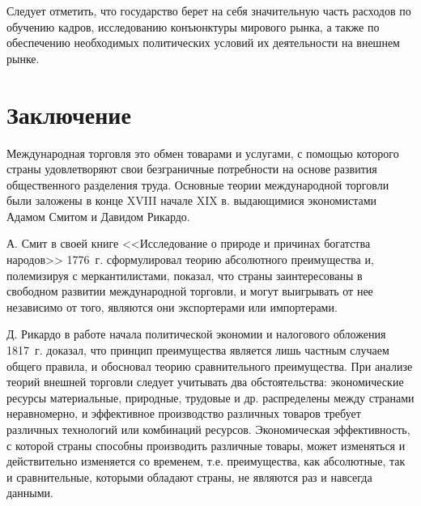 \begin{enumerate}
    Следует отметить, что государство берет на себя значительную часть расходов
    по обучению кадров, исследованию конъюнктуры мирового рынка, а также по
    обеспечению необходимых политических условий их деятельности на внешнем
    рынке.
\end{enumerate}

\chapter*{Заключение}

Международная торговля это обмен товарами и услугами, с помощью которого страны
удовлетворяют свои безграничные потребности на основе развития общественного
разделения труда. Основные теории международной торговли были заложены в конце
XVIII начале XIX в. выдающимися экономистами Адамом Смитом и Давидом Рикардо.

А. Смит в своей книге <<Исследование о природе и причинах богатства народов>>
1776~г. сформулировал теорию абсолютного преимущества и, полемизируя с
меркантилистами, показал, что страны заинтересованы в свободном развитии
международной торговли, и могут выигрывать от нее независимо от того, являются
они экспортерами или импортерами.

Д. Рикардо в работе начала политической экономии и налогового обложения 1817~г.
доказал, что принцип преимущества является лишь частным случаем общего правила,
и обосновал теорию сравнительного преимущества. При анализе теорий внешней
торговли следует учитывать два обстоятельства: экономические ресурсы
материальные, природные, трудовые и др. распределены между странами
неравномерно, и эффективное производство различных товаров требует различных
технологий или комбинаций ресурсов. Экономическая эффективность, с которой
страны способны производить различные товары, может изменяться и действительно
изменяется со временем, т.е. преимущества, как абсолютные, так и сравнительные,
которыми обладают страны, не являются раз и навсегда данными.

